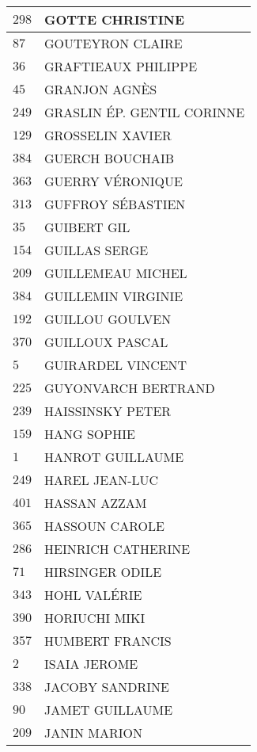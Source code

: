 \begin{xltabular}{\linewidth}{|l|X|}
    \hline
    $298$ & GOTTE CHRISTINE \\
    \hline
    $87$ & GOUTEYRON CLAIRE \\
    \hline
    $36$ & GRAFTIEAUX PHILIPPE \\
    \hline
    $45$ & GRANJON AGNÈS \\
    \hline
    $249$ & GRASLIN ÉP. GENTIL CORINNE \\
    \hline
    $129$ & GROSSELIN XAVIER \\
    \hline
    $384$ & GUERCH BOUCHAIB \\
    \hline
    $363$ & GUERRY VÉRONIQUE \\
    \hline
    $313$ & GUFFROY SÉBASTIEN \\
    \hline
    $35$ & GUIBERT GIL \\
    \hline
    $154$ & GUILLAS SERGE \\
    \hline
    $209$ & GUILLEMEAU MICHEL \\
    \hline
    $384$ & GUILLEMIN VIRGINIE \\
    \hline
    $192$ & GUILLOU GOULVEN \\
    \hline
    $370$ & GUILLOUX PASCAL \\
    \hline
    $5$ & GUIRARDEL VINCENT \\
    \hline
    $225$ & GUYONVARCH BERTRAND \\
    \hline
    $239$ & HAISSINSKY PETER \\
    \hline
    $159$ & HANG SOPHIE \\
    \hline
    $1$ & HANROT GUILLAUME \\
    \hline
    $249$ & HAREL JEAN-LUC \\
    \hline
    $401$ & HASSAN AZZAM \\
    \hline
    $365$ & HASSOUN CAROLE \\
    \hline
    $286$ & HEINRICH CATHERINE \\
    \hline
    $71$ & HIRSINGER ODILE \\
    \hline
    $343$ & HOHL VALÉRIE \\
    \hline
    $390$ & HORIUCHI MIKI \\
    \hline
    $357$ & HUMBERT FRANCIS \\
    \hline
    $2$ & ISAIA JEROME \\
    \hline
    $338$ & JACOBY SANDRINE \\
    \hline
    $90$ & JAMET GUILLAUME \\
    \hline
    $209$ & JANIN MARION \\

\end{xltabular}
